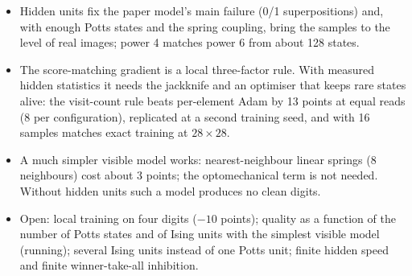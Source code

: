 \documentclass[11pt,a4paper]{article}
\begin{document}
\begin{itemize}
\item Hidden units fix the paper model's main failure (0/1 superpositions) and, with enough Potts states and the
  spring coupling, bring the samples to the level of real images; power 4 matches power 6 from about 128 states.
\item The score-matching gradient is a local three-factor rule. With measured hidden statistics it needs the
  jackknife and an optimiser that keeps rare states alive: the visit-count rule beats per-element Adam by 13
  points at equal reads (8 per configuration), replicated at a second training seed, and with 16 samples matches
  exact training at $28\times28$.
\item A much simpler visible model works: nearest-neighbour linear springs (8 neighbours) cost about 3 points; the
  optomechanical term is not needed. Without hidden units such a model produces no clean digits.
\item Open: local training on four digits ($-10$ points); quality as a function of the number of Potts states and
  of Ising units with the simplest visible model (running); several Ising units instead of one Potts unit; finite
  hidden speed and finite winner-take-all inhibition.
\end{itemize}
\end{document}
